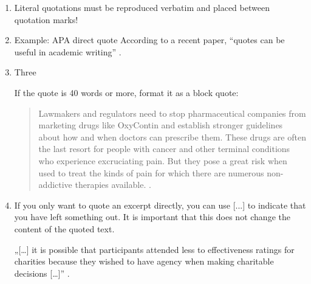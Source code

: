 \begin{enumerate}
    \item Literal quotations must be reproduced verbatim and placed between quotation marks!
    \item Example: APA direct quote According to a recent paper, “quotes can be useful in academic writing” \parencite[p. 25]{singh2019}.
    \item Three

If the quote is 40 words or more, format it as a block quote:
\begin{quote}
    Lawmakers and regulators need to stop pharmaceutical companies from marketing drugs like OxyContin and establish stronger guidelines about how and when doctors can prescribe them. These drugs are often the last resort for people with cancer and other terminal conditions who experience excruciating pain. But they pose a great risk when used to treat the kinds of pain for which there are numerous non-addictive therapies available. \parencite{editorialboard2018}.
\end{quote}
\item  If you only want to quote an excerpt
directly, you can use [...] to indicate that you have left something out. It is
important that this does not change the content of the quoted text.

„[…] it is possible that participants attended less to effectiveness
ratings for charities because they wished to have agency when making charitable
decisions […]” \parencite[p. 827]{ransbotham2018}.


\end{enumerate}
